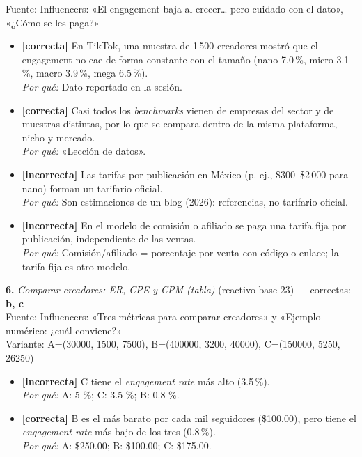 \documentclass[10pt,letterpaper]{article}
\begin{document}
{{\scriptsize Fuente: Influencers: «El engagement baja al crecer… pero cuidado con el dato», «¿Cómo se les paga?»}
\begin{itemize}[leftmargin=1.2em,itemsep=0pt,topsep=1pt,parsep=0pt]
\item[\textbf{a)}] {\footnotesize \textbf{[correcta]} En TikTok, una muestra de 1\,500 creadores mostró que el engagement no cae de forma constante con el tamaño (nano 7.0\,\%, micro 3.1\,\%, macro 3.9\,\%, mega 6.5\,\%).\\ \textit{Por qué:} Dato reportado en la sesión.}
\item[\textbf{b)}] {\footnotesize \textbf{[correcta]} Casi todos los \textit{benchmarks} vienen de empresas del sector y de muestras distintas, por lo que se compara dentro de la misma plataforma, nicho y mercado.\\ \textit{Por qué:} «Lección de datos».}
\item[\textbf{c)}] {\footnotesize \textbf{[incorrecta]} Las tarifas por publicación en México (p. ej., \$300--\$2\,000 para nano) forman un tarifario oficial.\\ \textit{Por qué:} Son estimaciones de un blog (2026): referencias, no tarifario oficial.}
\item[\textbf{d)}] {\footnotesize \textbf{[incorrecta]} En el modelo de comisión o afiliado se paga una tarifa fija por publicación, independiente de las ventas.\\ \textit{Por qué:} Comisión/afiliado = porcentaje por venta con código o enlace; la tarifa fija es otro modelo.}
\end{itemize}
\vspace{3pt}\noindent\textbf{6.} \textit{Comparar creadores: ER, CPE y CPM (tabla)} (reactivo base 23) — correctas: \textbf{b, c}\\[-1pt]
{\scriptsize Fuente: Influencers: «Tres métricas para comparar creadores» y «Ejemplo numérico: ¿cuál conviene?»}
\\{\scriptsize Variante: A=(30000, 1500, 7500), B=(400000, 3200, 40000), C=(150000, 5250, 26250)}
\begin{itemize}[leftmargin=1.2em,itemsep=0pt,topsep=1pt,parsep=0pt]
\item[\textbf{a)}] {\footnotesize \textbf{[incorrecta]} C tiene el \textit{engagement rate} más alto (3.5\,\%).\\ \textit{Por qué:} A: 5 \%; C: 3.5 \%; B: 0.8 \%.}
\item[\textbf{b)}] {\footnotesize \textbf{[correcta]} B es el más barato por cada mil seguidores (\$100.00), pero tiene el \textit{engagement rate} más bajo de los tres (0.8\,\%).\\ \textit{Por qué:} A: \$250.00; B: \$100.00; C: \$175.00.}

\end{itemize}}
\end{document}

